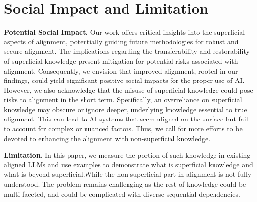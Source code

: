 \section{Social Impact and Limitation}
\label{app:discussion}

\textbf{Potential Social Impact.} Our work offers critical insights into the superficial aspects of alignment, potentially guiding future methodologies for robust and secure alignment. The implications regarding the transferability and restorability of superficial knowledge present mitigation for potential risks associated with alignment. Consequently, we envision that improved alignment, rooted in our findings, could yield significant positive social impacts for the proper use of AI. However, we also acknowledge that the misuse of superficial knowledge could pose risks to alignment in the short term. Specifically, an overreliance on superficial knowledge may obscure or ignore deeper, underlying knowledge essential to true alignment. This can lead to AI systems that seem aligned on the surface but fail to account for complex or nuanced factors. Thus, we call for more efforts to be devoted to enhancing the alignment with non-superficial knowledge.

\textbf{Limitation.} In this paper, we measure the portion of such knowledge in existing aligned LLMs and use examples to demonstrate what is superficial knowledge and what is beyond superficial.While the non-superficial part in alignment is not fully understood. The problem remains challenging as the rest of knowledge could be multi-faceted, and could be complicated with diverse sequential dependencies.